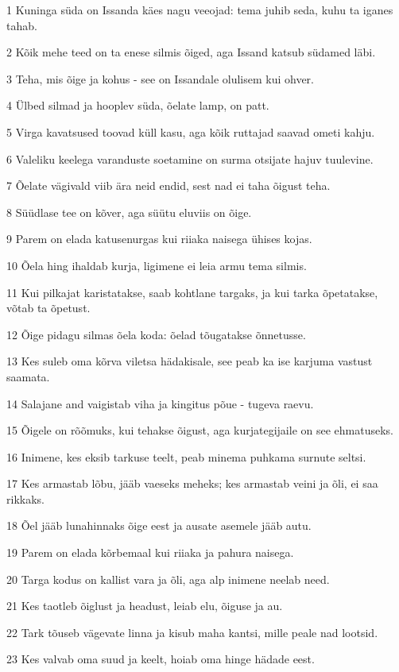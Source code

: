 \par 1 Kuninga süda on Issanda käes nagu veeojad: tema juhib seda, kuhu ta iganes tahab.
\par 2 Kõik mehe teed on ta enese silmis õiged, aga Issand katsub südamed läbi.
\par 3 Teha, mis õige ja kohus - see on Issandale olulisem kui ohver.
\par 4 Ülbed silmad ja hooplev süda, õelate lamp, on patt.
\par 5 Virga kavatsused toovad küll kasu, aga kõik ruttajad saavad ometi kahju.
\par 6 Valeliku keelega varanduste soetamine on surma otsijate hajuv tuulevine.
\par 7 Õelate vägivald viib ära neid endid, sest nad ei taha õigust teha.
\par 8 Süüdlase tee on kõver, aga süütu eluviis on õige.
\par 9 Parem on elada katusenurgas kui riiaka naisega ühises kojas.
\par 10 Õela hing ihaldab kurja, ligimene ei leia armu tema silmis.
\par 11 Kui pilkajat karistatakse, saab kohtlane targaks, ja kui tarka õpetatakse, võtab ta õpetust.
\par 12 Õige pidagu silmas õela koda: õelad tõugatakse õnnetusse.
\par 13 Kes suleb oma kõrva viletsa hädakisale, see peab ka ise karjuma vastust saamata.
\par 14 Salajane and vaigistab viha ja kingitus põue - tugeva raevu.
\par 15 Õigele on rõõmuks, kui tehakse õigust, aga kurjategijaile on see ehmatuseks.
\par 16 Inimene, kes eksib tarkuse teelt, peab minema puhkama surnute seltsi.
\par 17 Kes armastab lõbu, jääb vaeseks meheks; kes armastab veini ja õli, ei saa rikkaks.
\par 18 Õel jääb lunahinnaks õige eest ja ausate asemele jääb autu.
\par 19 Parem on elada kõrbemaal kui riiaka ja pahura naisega.
\par 20 Targa kodus on kallist vara ja õli, aga alp inimene neelab need.
\par 21 Kes taotleb õiglust ja headust, leiab elu, õiguse ja au.
\par 22 Tark tõuseb vägevate linna ja kisub maha kantsi, mille peale nad lootsid.
\par 23 Kes valvab oma suud ja keelt, hoiab oma hinge hädade eest.

